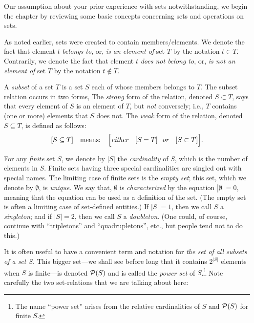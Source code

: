 Our assumption about your prior experience with sets notwithstanding, we begin the chapter by reviewing some basic concepts concerning sets and operations on sets.

\medskip

 
As noted earlier, sets were created to contain members/elements.  We denote the fact that element $t$ {\it belongs to}, or, {\it is an element of} set $T$ by the notation $t \in T$.  Contrarily,
we denote the fact that element $t$ {\it does not belong to}, or, {\it is not an element of} set $T$ by the notation $t \not\in T$. 

\smallskip

  
A {\em subset} of a set $T$ is a set $S$ each of whose members belongs to $T$.  The subset relation occurs in two forms, The {\em strong} form of the relation, denoted $S \subset T$, says that every element of $S$ is an element of $T$, but {\em not} conversely; i.e., $T$ contains (one or more) elements that $S$ does not.  The {\em weak} form of the relation, denoted $S \subseteq T$, is defined as follows:
\[
[S \subseteq T] \ \ \mbox{ means: } \ \
\Big[ \mbox{\em either } \ \ [S = T]
\ \ \mbox{\em or } \ \ [S \subset T] \Big].
\]

   
\index{set!empty set} \index{set!doubleton (set)}
 
For any {\em finite} set $S$, we denote by $|S|$ the {\it cardinality} of $S$, which is the number of elements in $S$.  Finite sets having three special cardinalities are singled out with special names.  The limiting case of finite sets is the {\em empty set}; this set, which we denote by
$\emptyset$, is {\em unique}.  We say that, $\emptyset$ is {\it characterized} by the equation $|\emptyset| = 0$, meaning that the equation can be used as a definition of the set.  (The empty set is often a limiting case of set-defined entities.)  If $|S| = 1$, then we call $S$ a {\em singleton}; and if $|S| = 2$, then we call $S$ a {\em doubleton}.  (One could, of course, continue with ``tripletons'' and ``quadrupletons'', etc., but people tend not to do this.)

\smallskip

It is often useful to have a convenient term and notation for {\em the set of all subsets of a set $S$}.  This bigger set---we shall see before long that it contains $2^{|S|}$ elements when $S$ is finite---is denoted $\mbox{$\cal P$}(S)$ and is called the {\em power set} of $S$.\footnote{The name ``power set'' arises from the relative cardinalities of $S$ and ${\cal P}(S)$ for finite $S$.}  Note carefully the two set-relations that we are talking about here: 

